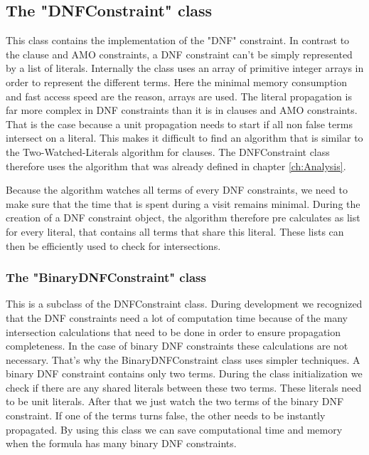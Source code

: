 \subsection{The "DNFConstraint" class}

This class contains the implementation of the "DNF" constraint. In contrast to the clause and AMO constraints, a DNF constraint can't be simply represented by a list of literals. Internally the class uses an array of primitive integer arrays in order to represent the different terms. Here the minimal memory consumption and fast access speed are the reason, arrays are used. The literal propagation is far more complex in DNF constraints than it is in clauses and AMO constraints. That is the case because a unit propagation needs to start if all non false terms intersect on a literal. This makes it difficult to find an algorithm that is similar to the Two-Watched-Literals algorithm for clauses. The DNFConstraint class therefore uses the algorithm that was already defined in chapter \ref{ch:Analysis}.
\par
Because the algorithm watches all terms of every DNF constraints, we need to make sure that the time that is spent during a visit remains minimal. During the creation of a DNF constraint object, the algorithm therefore pre calculates as list for every literal, that contains all terms that share this literal. These lists can then be efficiently used to check for intersections.

\subsubsection{The "BinaryDNFConstraint" class}

This is a subclass of the DNFConstraint class. During development we recognized that the DNF constraints need a lot of computation time because of the many intersection calculations that need to be done in order to ensure propagation completeness. In the case of binary DNF constraints these calculations are not necessary. That's why the BinaryDNFConstraint class uses simpler techniques. A binary DNF constraint contains only two terms. During the class initialization we check if there are any shared literals between these two terms. These literals need to be unit literals. After that we just watch the two terms of the binary DNF constraint. If one of the terms turns false, the other needs to be instantly propagated. By using this class we can save computational time and memory when the formula has many binary DNF constraints.

